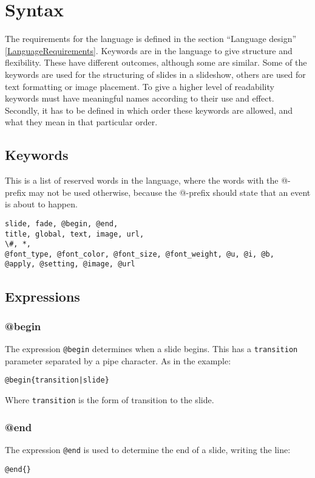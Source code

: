 \chapter{Syntax}
\label{SSyntax}

The requirements for the language is defined in the section ``Language design'' \ref{LanguageRequirements}. Keywords are in the language to give structure and flexibility. These have different outcomes, although some are similar. Some of the keywords are used for the structuring of slides in a slideshow, others are used for text formatting or image placement. To give a higher level of readability keywords must have meaningful names according to their use and effect. Secondly, it has to be defined in which order these keywords are allowed, and what they mean in that particular order.

\section{Keywords}
This is a list of reserved words in the language, where the words with the @-prefix may not be used otherwise, because the @-prefix should state that an event is about to happen.

\begin{lstlisting}[frame=single]
slide, fade, @begin, @end, 
title, global, text, image, url,  
\#, *, 
@font_type, @font_color, @font_size, @font_weight, @u, @i, @b, 
@apply, @setting, @image, @url
\end{lstlisting}

\section{Expressions}

\subsection{@begin}
\label{@begin}
The expression \texttt{@begin} determines when a slide begins. This has a \texttt{transition} parameter separated by a pipe character. As in the example:
\begin{lstlisting}[frame=single]
@begin{transition|slide}
\end{lstlisting}
Where \texttt{transition} is the form of transition to the slide. 

\subsection{@end}
\label{@end}
The expression \texttt{@end} is used to determine the end of a slide, writing the line: 
\begin{lstlisting}[frame=single]
@end{}
\end{lstlisting}

